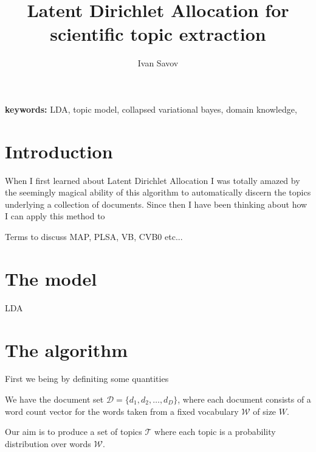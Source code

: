 \documentclass[11pt]{article}
\author{Ivan Savov}
\title{ {\Huge Latent Dirichlet Allocation for \\ scientific topic extraction } }
\newcommand{\DD}{\mathcal{D}}
\newcommand{\WW}{\mathcal{W}}
\newcommand{\TT}{\mathcal{T}}
\begin{document}
\maketitle



{\bf keywords: } LDA, topic model, collapsed variational bayes, domain knowledge, 



\section{Introduction}

	When I first learned about Latent Dirichlet Allocation I was totally amazed by the seemingly magical ability
	of this algorithm to automatically discern the topics underlying a collection of documents.
	Since then I have been thinking about how I can apply this method to  


    Terms to discuss MAP, PLSA, VB, CVB0 etc...


\section{The model}

    LDA 


\section{The algorithm}

    First we being by definiting some quantities
    
    We have the document set $\DD = \{ d_1, d_2, \ldots, d_D \}$, where each document consists of 
    a word count vector for the words taken from a fixed vocabulary $\WW$ of size $W$.
    
    Our aim is to produce a set of topics $\TT$ where each topic is a probability distribution over words $\WW$.
    
\end{document}
